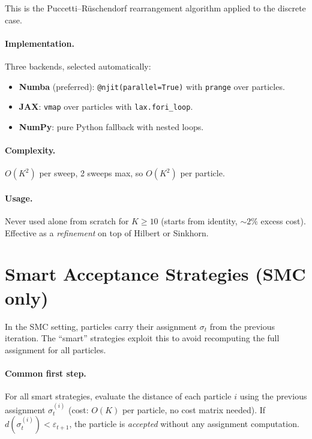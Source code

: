\documentclass[11pt,a4paper]{article}
\begin{document}
This is the Puccetti--R\"uschendorf rearrangement algorithm applied to the discrete case.

\paragraph{Implementation.}
Three backends, selected automatically:
\begin{itemize}
  \item \textbf{Numba} (preferred): \texttt{@njit(parallel=True)} with \texttt{prange} over particles.
  \item \textbf{JAX}: \texttt{vmap} over particles with \texttt{lax.fori\_loop}.
  \item \textbf{NumPy}: pure Python fallback with nested loops.
\end{itemize}

\paragraph{Complexity.} $O(K^2)$ per sweep, 2 sweeps max, so $O(K^2)$ per particle.

\paragraph{Usage.} Never used alone from scratch for $K \ge 10$ (starts from identity, $\sim 2\%$ excess cost). Effective as a \emph{refinement} on top of Hilbert or Sinkhorn.

\section{Smart Acceptance Strategies (SMC only)}
\label{sec:smart}

In the SMC setting, particles carry their assignment $\sigma_t$ from the previous iteration. The ``smart'' strategies exploit this to avoid recomputing the full assignment for all particles.

\paragraph{Common first step.} For all smart strategies, evaluate the distance of each particle $i$ using the previous assignment $\sigma_t^{(i)}$ (cost: $O(K)$ per particle, no cost matrix needed). If $d(\sigma_t^{(i)}) < \varepsilon_{t+1}$, the particle is \emph{accepted} without any assignment computation.
\end{document}
